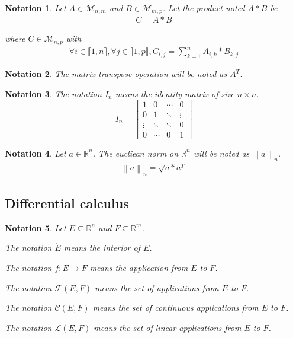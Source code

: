 \documentclass[11pt,en]{elegantpaper}
\newtheorem{notation}{Notation}
\newcommand{\norm}[1]{\left\lVert#1\right\rVert}
\newcommand{\Real}{\mathbb{R}}
\begin{document}
\begin{notation}
  Let $A \in \mathcal{M}_{n,m}$ and $B \in \mathcal{M}_{m,p}$. Let the product noted $A * B$ be \begin{gather*}
    C = A * B
  \end{gather*} \par
  where $C \in \mathcal{M}_{n,p}$ with \begin{gather*}
    \forall i \in \llbracket 1,n \rrbracket, \forall j \in \llbracket 1,p \rrbracket, C_{i,j} = \sum_{k=1}^n A_{i,k} * B_{k,j}
  \end{gather*}

\end{notation}

\begin{notation}
  The matrix transpose operation will be noted as $A^T$.
\end{notation}

\begin{notation}
  The notation $I_n$ means the identity matrix of size $n \times n$. \begin{equation*}
    I_n = \begin{bmatrix}
      1 & 0 & \cdots & 0 \\
      0 & 1 & \ddots & \vdots \\
      \vdots & \ddots & \ddots & 0 \\
      0 & \cdots & 0 & 1
    \end{bmatrix}
  \end{equation*}
\end{notation}

\begin{notation}
  Let $a \in \Real^n$. The eucliean norm on $\Real^n$ will be noted as $\norm a _n$.
  \begin{gather*}
    \norm a _n = \sqrt{a * a^T}
  \end{gather*}
\end{notation}

\subsection{Differential calculus}

\begin{notation}
  Let $E \subseteq \Real^n$ and $F \subseteq \Real^m$. \par
  The notation $\mathring{E}$ means the interior of $E$. \par
  The notation $f : E \longrightarrow F$ means the application from $E$ to $F$. \par
  The notation $\mathcal{F}(E,F)$ means the set of applications from $E$ to $F$. \par
  The notation $\mathcal{C}(E,F)$ means the set of continuous applications from $E$ to $F$. \par
  The notation $\mathcal{L}(E,F)$ means the set of linear applications from $E$ to $F$.
\end{notation}
\end{document}
